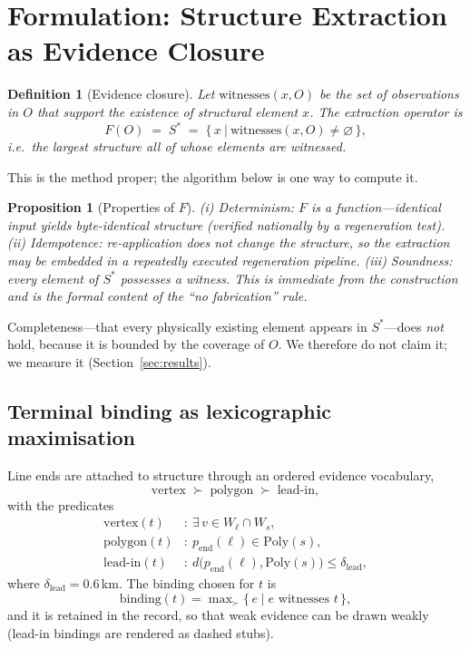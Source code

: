 \documentclass[journal]{IEEEtran}
\newtheorem{proposition}{Proposition}
\newtheorem{definition}{Definition}
\begin{document}
\section{Formulation: Structure Extraction as Evidence Closure}
\label{sec:formulation}

\begin{definition}[Evidence closure]
Let $\mathrm{witnesses}(x,O)$ be the set of observations in $O$ that support the
existence of structural element $x$. The extraction operator is
\begin{equation}
F(O)\;=\;S^{*}\;=\;\bigl\{\,x \ \big|\ \mathrm{witnesses}(x,O)\neq\varnothing \,\bigr\},
\end{equation}
i.e.\ the largest structure all of whose elements are witnessed.
\end{definition}

This is the method proper; the algorithm below is one way to compute it.

\begin{proposition}[Properties of $F$]\label{prop:F}
\emph{(i) Determinism:} $F$ is a function---identical input yields byte-identical
structure (verified nationally by a regeneration test).
\emph{(ii) Idempotence:} re-application does not change the structure, so the
extraction may be embedded in a repeatedly executed regeneration pipeline.
\emph{(iii) Soundness:} every element of $S^{*}$ possesses a witness. This is
immediate from the construction and is the formal content of the ``no
fabrication'' rule.
\end{proposition}

Completeness---that every physically existing element appears in $S^{*}$---does
\emph{not} hold, because it is bounded by the coverage of $O$. We therefore do
not claim it; we measure it (Section~\ref{sec:results}).

\subsection{Terminal binding as lexicographic maximisation}

Line ends are attached to structure through an ordered evidence vocabulary,
\begin{equation}
\text{vertex} \;\succ\; \text{polygon} \;\succ\; \text{lead-in},
\end{equation}
with the predicates
\begin{align}
\mathrm{vertex}(t)&:\ \exists\,v\in W_\ell\cap W_s,\\
\mathrm{polygon}(t)&:\ p_{\mathrm{end}}(\ell)\in\mathrm{Poly}(s),\\
\mathrm{lead\text{-}in}(t)&:\ d\bigl(p_{\mathrm{end}}(\ell),\mathrm{Poly}(s)\bigr)\le\delta_{\mathrm{lead}},
\end{align}
where $\delta_{\mathrm{lead}}=0.6$\,km. The binding chosen for $t$ is
\begin{equation}
\mathrm{binding}(t)=\max\nolimits_{\succ}\{\,e \mid e \text{ witnesses } t\,\},
\end{equation}
and it is retained in the record, so that weak evidence can be drawn weakly
(lead-in bindings are rendered as dashed stubs).
\end{document}
